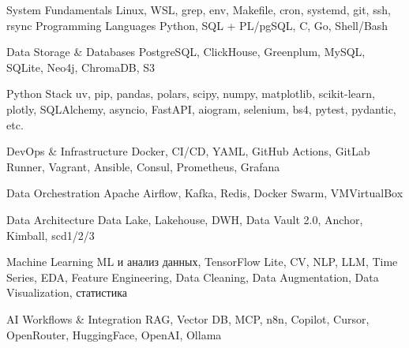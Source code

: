 


\begin{cvskills}

  \cvskill
    {System Fundamentals} %
    {Linux, WSL, grep, env, Makefile, cron, systemd, git, ssh, rsync} %
  \cvskill
    {Programming Languages} %
    {Python, SQL + PL/pgSQL, C, Go, Shell/Bash} %

  \cvskill
    {Data Storage \& Databases} %
    {PostgreSQL, ClickHouse, Greenplum, MySQL, SQLite, Neo4j, ChromaDB, S3} %

  \cvskill
    {Python Stack} %
    {uv, pip, pandas, polars, scipy, numpy, matplotlib, scikit-learn, plotly, SQLAlchemy, asyncio, FastAPI, aiogram, selenium, bs4, pytest, pydantic, etc.} %

  \cvskill
    {DevOps \& Infrastructure} %
    {Docker, CI/CD, YAML, GitHub Actions, GitLab Runner, Vagrant, Ansible, Consul, Prometheus, Grafana} %

  \cvskill
    {Data Orchestration} %
    {Apache Airflow, Kafka, Redis, Docker Swarm, VMVirtualBox} %

  \cvskill
    {Data Architecture} %
    {Data Lake, Lakehouse, DWH, Data Vault 2.0, Anchor, Kimball, scd1/2/3} %

  \cvskill
    {Machine Learning} %
    {ML и анализ данных, TensorFlow Lite, CV, NLP, LLM, Time Series, EDA, Feature Engineering, Data Cleaning, Data Augmentation, Data Visualization, статистика} %

  \cvskill
    {AI Workflows \& Integration} %
    {RAG, Vector DB, MCP, n8n, Copilot, Cursor, OpenRouter, HuggingFace, OpenAI, Ollama} %

\end{cvskills}


